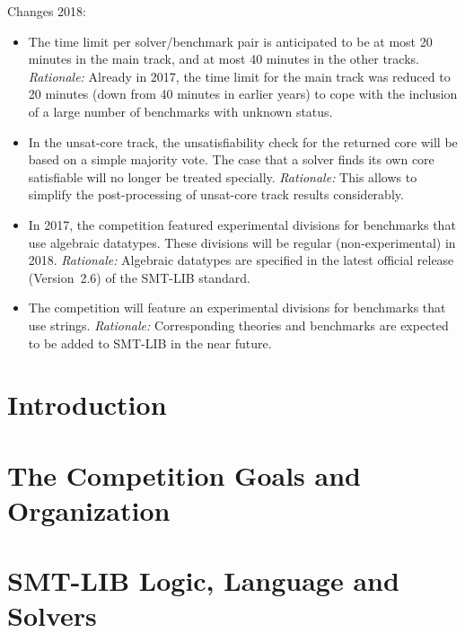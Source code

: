 \documentclass[twoside,11pt]{article}
\begin{document}
\begin{tjark}
Changes 2018:
\begin{itemize}
\item The time limit per solver/benchmark pair is anticipated to be at
  most 20 minutes in the main track, and at most 40 minutes in the
  other tracks.  \emph{Rationale:} Already in 2017, the time limit for
  the main track was reduced to 20 minutes (down from 40 minutes in
  earlier years) to cope with the inclusion of a large number of
  benchmarks with unknown status.
\item In the unsat-core track, the unsatisfiability check for the
  returned core will be based on a simple majority vote.  The case
  that a solver finds its own core satisfiable will no longer be
  treated specially.  \emph{Rationale:} This allows to simplify the
  post-processing of unsat-core track results considerably.
\item In 2017, the competition featured experimental divisions for
  benchmarks that use algebraic datatypes.  These divisions will be
  regular (non-experimental) in 2018. \emph{Rationale:} Algebraic
  datatypes are specified in the latest official release (Version~2.6)
  of the SMT-LIB standard.
\item The competition will feature an experimental divisions for
  benchmarks that use strings.  \emph{Rationale:} Corresponding
  theories and benchmarks are expected to be added to SMT-LIB in the
  near future.
\end{itemize}
\end{tjark}

\section{Introduction}
\label{sec:intro}


\section{The Competition Goals and Organization}
\label{sec:goals}


\section{SMT-LIB Logic, Language and Solvers}
\label{sec:context}
\end{document}
